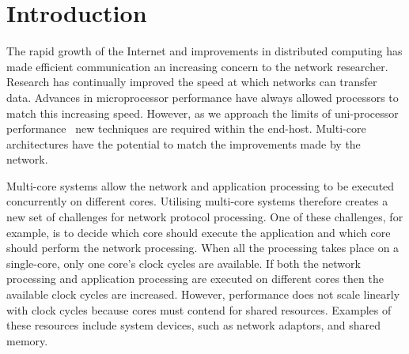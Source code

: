 \documentclass[conference, compsoc]{IEEEtran}
\begin{document}
\section{Introduction}
\label{sect:Intro}
The rapid growth of the Internet and improvements in distributed computing has made efficient communication an increasing concern to the network researcher. Research has continually improved the speed at which networks can transfer data. Advances in microprocessor performance have always allowed processors to match this increasing speed. However, as we approach the limits of uni-processor performance~\cite{agarwal00clock} new techniques are required within the end-host. Multi-core architectures have the potential to match the improvements made by the network.

Multi-core systems allow the network and application processing to be executed concurrently on different cores. %
Utilising multi-core systems therefore creates a new set of challenges for network protocol processing. One of these challenges, for example, is to decide which core should execute the application and which core should perform the network processing. When all the processing takes place on a single-core, only one core's clock cycles are available. If both the network processing and application processing are executed on different cores then the available clock cycles are increased. However, performance does not scale linearly with clock cycles because cores must contend for shared resources. Examples of these resources include system devices, such as network adaptors, and shared memory.

%
\end{document}
